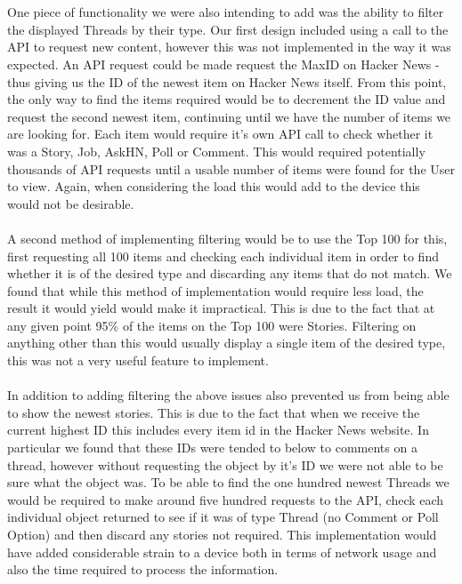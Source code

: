 \documentclass[11pt]{article}
\begin{document}
\\
\\
One piece of functionality we were also intending to add was the ability to filter the displayed Threads by their type. Our first design included using a call to the API to request new content, however this was not implemented in the way it was expected. An API request could be made request the MaxID on Hacker News - thus giving us the ID of the newest item on Hacker News itself. From this point, the only way to find the items required would be to decrement the ID value and request the second newest item, continuing until we have the number of items we are looking for. Each item would require it's own API call to check whether it was a Story, Job, AskHN, Poll or Comment. This would required potentially thousands of API requests until a usable number of items were found for the User to view. Again, when considering the load this would add to the device this would not be desirable.
\\
\\
A second method of implementing filtering would be to use the Top 100 for this, first requesting all 100 items and checking each individual item in order to find whether it is of the desired type and discarding any items that do not match. We found that while this method of implementation would require less load, the result it would yield would make it impractical. This is due to the fact that at any given point 95\% of the items on the Top 100 were Stories. Filtering on anything other than this would usually display a single item of the desired type, this was not a very useful feature to implement.
\\
\\
In addition to adding filtering the above issues also prevented us from being able to show the newest stories. This is due to the fact that when we receive the current highest ID this includes every item id in the Hacker News website. In particular we found that these IDs were tended to below to comments on a thread, however without requesting the object by it's ID we were not able to be sure what the object was. To be able to find the one hundred newest Threads we would be required to make around five hundred requests to the API, check each individual object returned to see if it was of type Thread (no Comment or Poll Option) and then discard any stories not required. This implementation would have added considerable strain to a device both in terms of network usage and also the time required to process the information.
\end{document}
